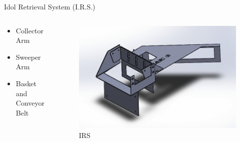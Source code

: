 \documentclass[aspectratio=43]{beamer}
\begin{document}
  \begin{frame}{Idol Retrieval System (I.R.S.)}
    \begin{columns}[c]
      \begin{column}[c]{5cm}
        \begin{itemize}
          \item Collector Arm
          \item Sweeper Arm
          \item Basket and Conveyor Belt
        \end{itemize}
      \end{column}
      \begin{column}[c]{5cm}
        \begin{figure}[h]
          \centering
          \includegraphics[scale = 0.225]{IRS.png}
          \vspace{7pt}
          \large{IRS}
        \end{figure}
      \end{column}
    \end{columns}
  \end{frame} 
  
\end{document}
